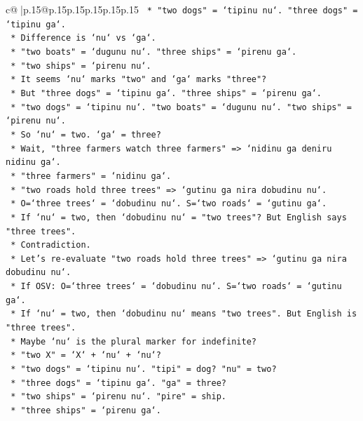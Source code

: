 \documentclass{article}
\begin{document}
{\begin{supertabular}{c@{$\;$}|p{.15\linewidth}@{}p{.15\linewidth}p{.15\linewidth}p{.15\linewidth}p{.15\linewidth}p{.15\linewidth}}
{{{\texttt{        *   "two dogs" = `tipinu nu`. "three dogs" = `tipinu ga`.} \\
\texttt{        *   Difference is `nu` vs `ga`.} \\
\texttt{        *   "two boats" = `dugunu nu`. "three ships" = `pirenu ga`.} \\
\texttt{        *   "two ships" = `pirenu nu`.} \\
\texttt{        *   It seems `nu` marks "two" and `ga` marks "three"?} \\
\texttt{        *   But "three dogs" = `tipinu ga`. "three ships" = `pirenu ga`.} \\
\texttt{        *   "two dogs" = `tipinu nu`. "two boats" = `dugunu nu`. "two ships" = `pirenu nu`.} \\
\texttt{        *   So `nu` = two. `ga` = three?} \\
\texttt{        *   Wait, "three farmers watch three farmers" => `nidinu ga deniru nidinu ga`.} \\
\texttt{        *   "three farmers" = `nidinu ga`.} \\
\texttt{        *   "two roads hold three trees" => `gutinu ga nira dobudinu nu`.} \\
\texttt{        *   O=`three trees` = `dobudinu nu`. S=`two roads` = `gutinu ga`.} \\
\texttt{        *   If `nu` = two, then `dobudinu nu` = "two trees"? But English says "three trees".} \\
\texttt{        *   Contradiction.} \\
\texttt{        *   Let's re{-}evaluate "two roads hold three trees" => `gutinu ga nira dobudinu nu`.} \\
\texttt{        *   If OSV: O=`three trees` = `dobudinu nu`. S=`two roads` = `gutinu ga`.} \\
\texttt{        *   If `nu` = two, then `dobudinu nu` means "two trees". But English is "three trees".} \\
\texttt{        *   Maybe `nu` is the plural marker for indefinite?} \\
\texttt{        *   "two X" = `X` + `nu` + `nu`?} \\
\texttt{        *   "two dogs" = `tipinu nu`. "tipi" = dog? "nu" = two?} \\
\texttt{        *   "three dogs" = `tipinu ga`. "ga" = three?} \\
\texttt{        *   "two ships" = `pirenu nu`. "pire" = ship.} \\
\texttt{        *   "three ships" = `pirenu ga`.} \\
}}}
\end{supertabular}}
\end{document}
